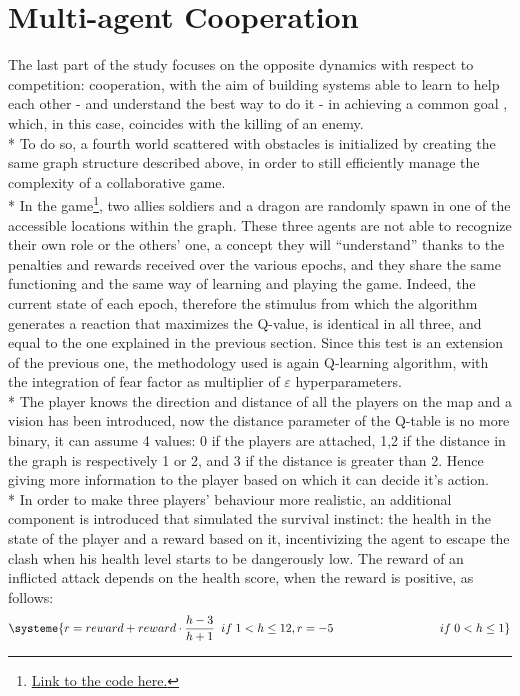 \section{Multi-agent Cooperation}
The last part of the study focuses on the opposite dynamics with respect to competition: cooperation, with the aim of building systems able to learn to help each other - and understand the best way to do it - in achieving a common goal , which, in this case, coincides with the killing of an enemy.\\*
To do so, a fourth world scattered with obstacles is initialized by creating the same graph structure described above, in order to still efficiently manage the complexity of a collaborative game.\\*
In the game\footnote{\href{https://github.com/moiraghif/DragonHunting/tree/master/TeamWork}{Link to the code here.}}, two allies soldiers and a dragon are randomly spawn in one of the accessible locations within the graph. 
These three agents are not able to recognize their own role or the others' one, a concept they will ``understand'' thanks to the penalties and rewards received over the various epochs, and they share the same functioning and the same way of learning and playing the game. 
Indeed, the current state of each epoch, therefore the stimulus from which the algorithm generates a reaction that maximizes the Q-value, is identical in all three, and equal to the one explained in the previous section. Since this test is an extension of the previous one, the methodology used is again Q-learning algorithm, with the integration of fear factor as multiplier of $\varepsilon$ hyperparameters. \\*
The player knows the direction and distance of all the players on the map and a vision has been introduced, now the distance parameter of the Q-table is no more binary, it can assume 4 values: 0 if the players are attached, 1,2 if the distance in the graph is respectively 1 or 2, and 3 if the distance is greater than 2. Hence giving more information to the player based on which it can decide it's action.\\*
In order to make three players' behaviour more realistic, an additional component is introduced that simulated the survival instinct: the health in the state of the player and a reward based on it, incentivizing the agent to escape the clash when his health level starts to be dangerously low. 
The reward of an inflicted attack depends on the health score, when the reward is positive, as follows:
\[
\systeme{r = reward+reward\cdot\frac{h-3}{h+1}\;\;if\;1<h\leq 12, r = -5\qquad\qquad\qquad\qquad\quad if\;0<h\leq 1}
\]
